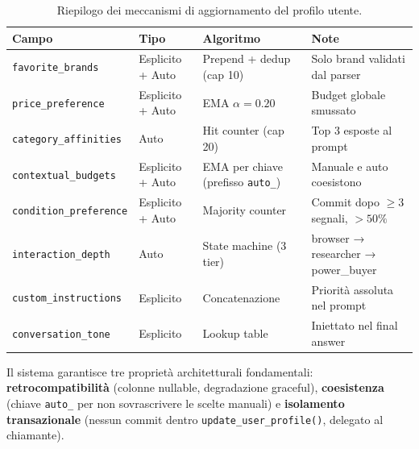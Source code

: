 \begin{table}[htbp]
\centering
\small
\begin{tabular}{p{3.2cm} p{2.5cm} p{3cm} p{4cm}}
\hline
\textbf{Campo} & \textbf{Tipo} & \textbf{Algoritmo} & \textbf{Note} \\
\hline
\texttt{favorite\_brands}
    & Esplicito + Auto
    & Prepend + dedup (cap 10)
    & Solo brand validati dal parser \\
\hline
\texttt{price\_preference}
    & Esplicito + Auto
    & EMA $\alpha=0.20$
    & Budget globale smussato \\
\hline
\texttt{category\_affinities}
    & Auto
    & Hit counter (cap 20)
    & Top 3 esposte al prompt \\
\hline
\texttt{contextual\_budgets}
    & Esplicito + Auto
    & EMA per chiave (prefisso \texttt{auto\_})
    & Manuale e auto coesistono \\
\hline
\texttt{condition\_preference}
    & Esplicito + Auto
    & Majority counter
    & Commit dopo $\geq3$ segnali, $>50\%$ \\
\hline
\texttt{interaction\_depth}
    & Auto
    & State machine (3 tier)
    & browser → researcher → power\_buyer \\
\hline
\texttt{custom\_instructions}
    & Esplicito
    & Concatenazione
    & Priorità assoluta nel prompt \\
\hline
\texttt{conversation\_tone}
    & Esplicito
    & Lookup table
    & Iniettato nel final answer \\
\hline
\end{tabular}
\caption{Riepilogo dei meccanismi di aggiornamento del profilo utente.}
\label{tab:profiling-mechanisms}
\end{table}

Il sistema garantisce tre proprietà architetturali fondamentali:
\textbf{retrocompatibilità} (colonne nullable, degradazione graceful),
\textbf{coesistenza} (chiave \texttt{auto\_} per non sovrascrivere le
scelte manuali) e \textbf{isolamento transazionale} (nessun commit
dentro \texttt{update\_user\_profile()}, delegato al chiamante).
